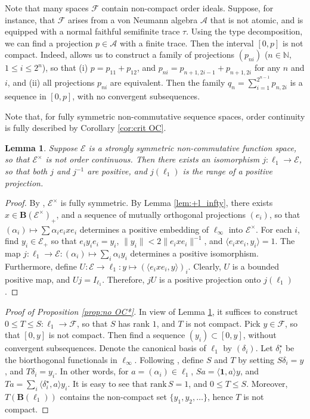 \documentclass[12pt]{amsart}
\theoremstyle{plain}
\newtheorem{lemma}[theorem]{Lemma}
\theoremstyle{definition}
\renewcommand{\leq}{\leqslant}
\newcommand{\one}{\mathbf{1}}
\newcommand{\N}{\mathbb N}
\newcommand{\ce}{\mathcal E}
\newcommand{\ball}{\mathbf{B}}
\newcommand{\A}{\mathcal{A}}
\def \rank{{\mathrm{rank}} \, }
\begin{document}
Note that many spaces ${\mathcal{F}}$ contain non-compact order
ideals. Suppose, for instance, that ${\mathcal{F}}$ arises from a von
Neumann algebra $\A$ that is not atomic, and is equipped with a normal
faithful semifinite trace $\tau$. Using the type decomposition,
we can find a projection $p \in \A$ with a finite trace.
Then the interval $[0,p]$ is not compact. Indeed,
\cite[Proposition V.1.35]{Tak} allows us to construct a family
of projections $(p_{ni})$ ($n \in \N$, $1 \leq i \leq 2^n$), so
that (i) $p = p_{11} + p_{12}$, and
$p_{ni} = p_{n+1,2i-1} + p_{n+1,2i}$ for any $n$ and $i$, and
(ii) all projections $p_{ni}$ are equivalent.
Then the family $q_n = \sum_{i=1}^{2^{n-1}} p_{n,2i}$
is a sequence in $[0,p]$, with no convergent subsequences.

Note that, for fully symmetric non-commutative sequence spaces,
order continuity is fully described by Corollary \ref{cor:crit OC}.

\begin{lemma}\label{lem:dual OC}
Suppose $\ce$ is a strongly symmetric non-commutative function space,
so that $\ce^\times$ is not order continuous. Then there exists
an isomorphism $j : \ell_1 \to \ce$, so that both $j$ and $j^{-1}$
are positive, and $j(\ell_1)$ is the range of a positive projection.
\end{lemma}

\begin{proof}
By \cite{DDdP93}, $\ce^\times$ is fully symmetric. By
Lemma \ref{lem:+l_infty}, there exists $x \in \ball(\ce^\times)_+$,
and a sequence of mutually orthogonal projections $(e_i)$, so
that $(\alpha_i) \mapsto \sum \alpha_i e_i x e_i$ determines
a positive embedding of $\ell_\infty$ into $\ce^\times$.
For each $i$, find $y_i \in \ce_+$ so that $e_i y_i e_i = y_i$,
$\|y_i\| < 2 \|e_i x e_i\|^{-1}$, and $\langle e_i x e_i, y_i \rangle = 1$.
The map $j : \ell_1 \to \ce : (\alpha_i) \mapsto \sum_i \alpha_i y_i$
determines a positive isomorphism. Furthermore, define
$U : \ce \to \ell_1 : y \mapsto (\langle e_i x e_i , y \rangle)_i$.
Clearly, $U$ is a bounded positive map, and $Uj = I_{\ell_1}$.
Therefore, $jU$ is a positive projection onto $j(\ell_1)$.
\end{proof}


\begin{proof}[Proof of Proposition \ref{prop:no OC*}]
In view of Lemma \ref{lem:dual OC}, it suffices to construct
$0 \leq T \leq S : \ell_1 \to {\mathcal{F}}$, so that $S$
has rank $1$, and $T$ is not compact.
Pick $y \in {\mathcal{F}}$, so that $[0,y]$ is not compact.
Then find a sequence $(y_i) \subset [0, y]$, without convergent subsequences.
Denote the canonical basis of $\ell_1$ by $(\delta_i)$. Let
$\delta_i^\star$ be the biorthogonal functionals in $\ell_\infty$.
Following \cite{Wi}, define $S$ and $T$ by setting $S \delta_i = y$, and
$T \delta_i = y_i$. In other words, for $a = (\alpha_i) \in \ell_1$,
$S a = \langle \one, a \rangle y$, and
$T a = \sum_i \langle \delta_i^\star, a \rangle y_i$.
It is easy to see that $\rank S = 1$, and $0 \leq T \leq S$.
Moreover, $T(\ball(\ell_1))$ contains the non-compact set
$\{y_1, y_2, \ldots\}$, hence $T$ is not compact.
\end{proof}
\end{document}
